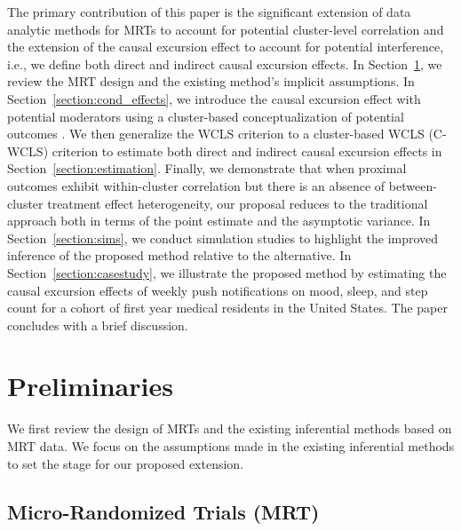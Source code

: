 \documentclass[12pt]{article}
\begin{document}
The primary contribution of this paper is the significant extension of data analytic methods for MRTs to account for potential cluster-level correlation and the extension of the causal excursion effect to account for potential interference, i.e., we define both direct and indirect causal excursion effects.  In Section~\ref{section:preliminaries}, we review the MRT design and the existing method's implicit assumptions.  In Section~\ref{section:cond_effects}, we introduce the causal excursion effect with potential moderators using a cluster-based conceptualization of potential outcomes \citep{Hong2006,Vanderweele2013}.  We then generalize the WCLS criterion to a cluster-based WCLS (C-WCLS) criterion to estimate both direct and indirect causal excursion effects in Section~\ref{section:estimation}.  Finally, we demonstrate that when proximal outcomes exhibit within-cluster correlation but there is an absence of between-cluster treatment effect heterogeneity, our proposal reduces to the traditional approach both in terms of the point estimate and the asymptotic variance.  In Section~\ref{section:sims}, we conduct simulation studies to highlight the improved inference of the proposed method relative to the alternative.  In Section~\ref{section:casestudy}, we illustrate the proposed method by estimating the causal excursion effects of weekly push notifications on mood, sleep, and step count for a cohort of first year medical residents in the United States. The paper concludes with a brief discussion.

\section{Preliminaries}
\label{section:preliminaries}

We first review the design of MRTs and the existing inferential methods based on MRT data. We focus on the assumptions made in the existing inferential methods to set the stage for our proposed extension.

\subsection{Micro-Randomized Trials (MRT)}
\end{document}
